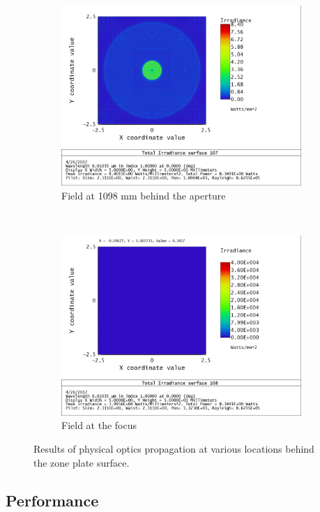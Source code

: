 \documentclass[10pt,letterpaper]{article}
\begin{document}
\begin{figure}[h!]
\begin{subfigure}[t]{0.49\textwidth}
						\includegraphics[width=\textwidth]{pop/pop107}
						\caption{Field at 1098 mm behind the aperture}
						\label{pop3}
					\end{subfigure}
					~
					\begin{subfigure}[t]{0.49\textwidth}
						\includegraphics[width=\textwidth]{pop/pop108}	
						\caption{Field at the focus}
						\label{pop4}
					\end{subfigure}
					\caption{Results of physical optics propagation at various locations behind the zone plate surface.}
					\label{pop}
				\end{figure}
			
		\subsection{Performance}
\end{document}
